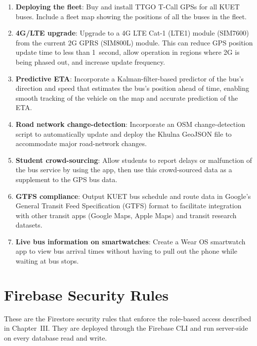 \documentclass[12pt,a4paper]{report}
\renewcommand{\thechapter}{\Roman{chapter}}
\begin{document}
\begin{enumerate}[leftmargin=*, label=\arabic*.]
	\item \textbf{Deploying the fleet}: Buy and install TTGO T-Call GPSs for all KUET buses. Include a fleet map showing the positions of all the buses in the fleet.
	\item \textbf{4G/LTE upgrade}: Upgrade to a 4G LTE Cat-1 (LTE1) module (SIM7600) from the current 2G GPRS (SIM800L) module. This can reduce GPS position update time to less than 1~second, allow operation in regions where 2G is being phased out, and increase update frequency.
	\item \textbf{Predictive ETA}: Incorporate a Kalman-filter-based predictor of the bus's direction and speed that estimates the bus's position ahead of time, enabling smooth tracking of the vehicle on the map and accurate prediction of the ETA.
	\item \textbf{Road network change-detection}: Incorporate an OSM change-detection script to automatically update and deploy the Khulna GeoJSON file to accommodate major road-network changes.
	\item \textbf{Student crowd-sourcing}: Allow students to report delays or malfunction of the bus service by using the app, then use this crowd-sourced data as a supplement to the GPS bus data.
	\item \textbf{GTFS compliance}: Output KUET bus schedule and route data in Google's General Transit Feed Specification (GTFS) format to facilitate integration with other transit apps (Google Maps, Apple Maps) and transit research datasets.
	\item \textbf{Live bus information on smartwatches}: Create a Wear OS smartwatch app to view bus arrival times without having to pull out the phone while waiting at bus stops.
\end{enumerate}

\appendix
\renewcommand{\thechapter}{\Alph{chapter}}

\chapter{Firebase Security Rules}

These are the Firestore security rules that enforce the role-based access described in Chapter~III. They are deployed through the Firebase CLI and run server-side on every database read and write.
\end{document}
